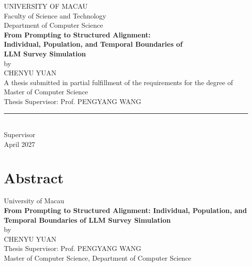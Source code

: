 \documentclass[12pt,a4paper]{report}
\begin{document}
\begin{titlepage}
\thispagestyle{empty}
\begin{center}
{\large UNIVERSITY OF MACAU}\\[0.2cm]
{\large Faculty of Science and Technology}\\[0.2cm]
{\large Department of Computer Science}\\[1.2cm]
{\Large\bfseries From Prompting to Structured Alignment:\\[0.2cm]
Individual, Population, and Temporal Boundaries of\\[0.2cm]
LLM Survey Simulation}\\[1.2cm]
by\\[0.3cm]
{\large CHENYU YUAN}\\[1.2cm]
A thesis submitted in partial fulfillment of the requirements for the degree of\\[0.3cm]
{\large Master of Computer Science}\\[1.2cm]
Thesis Supervisor: Prof. PENGYANG WANG\\[0.8cm]
\rule{6cm}{0.4pt}\\
Supervisor\\[0.8cm]
April 2027
\end{center}
\end{titlepage}

\chapter*{Abstract}
\thispagestyle{empty}
\begin{center}
{\large University of Macau}\\[0.6cm]
{\bfseries From Prompting to Structured Alignment: Individual, Population, and Temporal Boundaries of LLM Survey Simulation}\\[0.4cm]
by\\[0.2cm]
CHENYU YUAN\\[0.3cm]
Thesis Supervisor: Prof. PENGYANG WANG\\[0.2cm]
Master of Computer Science, Department of Computer Science
\end{center}

\vspace{0.4cm}
\end{document}
